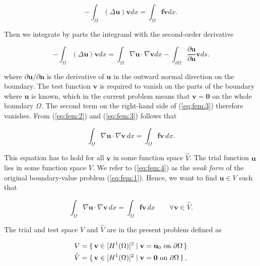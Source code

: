 \documentclass[a4paper,11pt,openright,twoside]{book}
\begin{document}
\begin{equation}
\label{eq:fem:2}
- \int_\Omega (\Delta \mathbf{u}) \mathbf{v} dx = \int_\Omega \mathbf{f} \mathbf{v} dx.
\end{equation}

Then we integrate by parts the integrand with the second-order derivative

\begin{equation}
\label{eq:fem:3}
- \int_\Omega (\Delta \mathbf{u}) \mathbf{v} dx =
\int_\Omega \nabla \mathbf{u} \cdot \nabla \mathbf{v} dx
- \int_{\partial \Omega} \frac{\partial \mathbf{u}}{\partial \mathbf{n}} \mathbf{v} ds.
\end{equation}

where $\partial \mathbf{u}/\partial \mathbf{n}$ is the derivative of $\mathbf{u}$ in the outward normal direction on the boundary. The test function $\mathbf{v}$ is required to vanish on the parts of the boundary where $\mathbf{u}$ is known, which in the current problem means that $\mathbf{v} = \mathbf{0}$ on the whole boundary $\Omega$. The second term on the right-hand side of (\ref{eq:fem:3}) therefore vanishes. From (\ref{eq:fem:2}) and (\ref{eq:fem:3}) follows that

\begin{equation}
\label{eq:fem:4}
\int_\Omega \nabla \mathbf{u} \cdot \nabla \mathbf{v} \, dx = \int_\Omega \mathbf{f} \mathbf{v} \, dx. 
\end{equation}

This equation has to hold for all $\mathbf{v}$ in some function space $\hat{V}$. The trial function $\mathbf{u}$ lies in some function space $V$. We refer to (\ref{eq:fem:4}) as the \emph{weak form} of the original boundary-value problem (\ref{eq:fem:1}).
Hence, we want to find $\mathbf{u} \in V$ such that

\begin{equation}
\label{eq:fem:5}
\int_\Omega \nabla \mathbf{u} \cdot \nabla \mathbf{v} \, dx = \int_\Omega \mathbf{f} \mathbf{v} \, dx \qquad \forall \mathbf{v} \in \hat{V}.
\end{equation}

The trial and test space $V$ and $\hat{V}$ are in the present problem defined as

\begin{align}
V &= \set{\mathbf{v} \in [H^1(\Omega)]^2 | \mathbf{v} = \mathbf{u}_0 \text{ on } \partial \Omega}  \\
\hat{V} &= \set{\mathbf{v} \in [H^1(\Omega)]^2 | \mathbf{v} = \mathbf{0} \text{ on } \partial \Omega}, 
\end{align}
\end{document}
